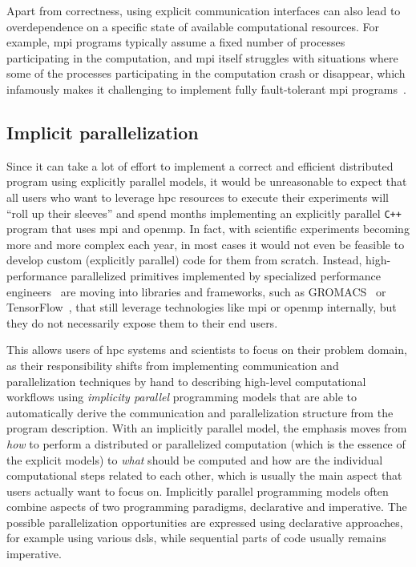 Apart from correctness, using explicit communication interfaces can also lead to overdependence on
a specific state of available computational resources. For example, \gls{mpi} programs
typically assume a fixed number of processes participating in the computation, and
\gls{mpi} itself struggles with situations where some of the processes participating
in the computation crash or disappear, which infamously makes it challenging to implement fully
fault-tolerant \gls{mpi} programs~\cite{fault_tolerant_mpi}.

\subsection*{Implicit parallelization}
Since it can take a lot of effort to implement a correct and efficient distributed program using
explicitly parallel models, it would be unreasonable to expect that all users who want to leverage
\gls{hpc} resources to execute their experiments will ``roll up their sleeves'' and
spend months implementing an explicitly parallel \texttt{C++} program that uses
\gls{mpi} and \gls{openmp}. In fact, with scientific experiments becoming
more and more complex each year, in most cases it would not even be feasible to develop custom
(explicitly parallel) code for them from scratch. Instead, high-performance parallelized primitives
implemented by specialized performance engineers~\cite{dace} are moving into libraries
and frameworks, such as GROMACS~\cite{gromacs,gromacs_mpi} or TensorFlow~\cite{tensorflow,horovod}, that
still leverage technologies like \gls{mpi} or \gls{openmp} internally, but
they do not necessarily expose them to their end users.

This allows users of \gls{hpc} systems and scientists to focus on their problem
domain, as their responsibility shifts from implementing communication and parallelization
techniques by hand to describing high-level computational workflows using \emph{implicity parallel}
programming models that are able to automatically derive the communication and parallelization
structure from the program description. With an implicitly parallel model, the emphasis moves from
\emph{how} to perform a distributed or parallelized computation (which is the essence
of the explicit models) to \emph{what} should be computed and how are the individual
computational steps related to each other, which is usually the main aspect that users actually
want to focus on. Implicitly parallel programming models often combine aspects of two programming
paradigms, declarative and imperative. The possible parallelization opportunities are expressed
using declarative approaches, for example using various \glspl{dsl}, while sequential
parts of code usually remains imperative.

